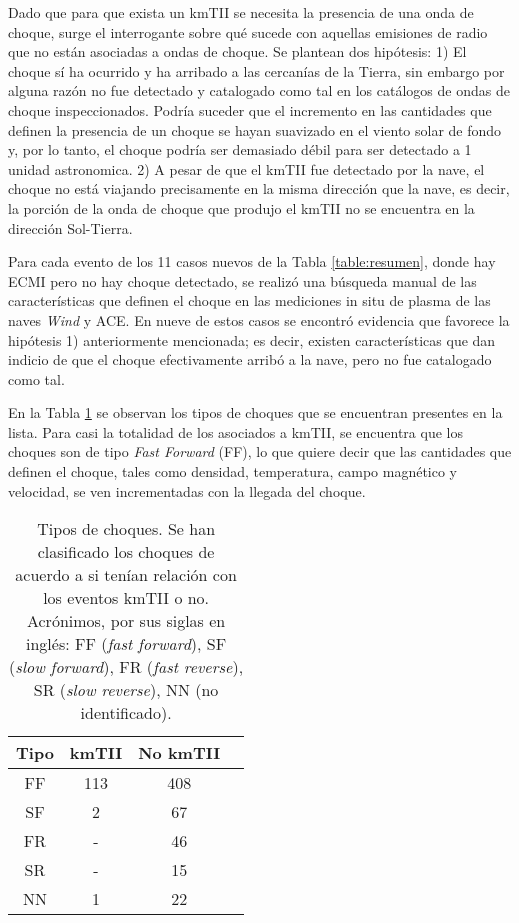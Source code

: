 \documentclass[baaa]{baaa}
\begin{document}
Dado que para que exista un kmTII se necesita la presencia de una onda de choque, surge el interrogante sobre qué sucede con aquellas emisiones de radio que no están asociadas a ondas de choque. Se plantean dos hipótesis: 1) El choque sí ha ocurrido y ha arribado a las cercanías de la Tierra, sin embargo por alguna razón no fue detectado y catalogado como tal en los catálogos de ondas de choque inspeccionados. Podría suceder que el incremento en las cantidades que definen la presencia de un choque se hayan suavizado en el viento solar de fondo y, por lo tanto, el choque podría ser demasiado débil para ser detectado a 1 unidad astronomica. 2) A pesar de que el kmTII fue detectado por la nave, el choque no está viajando precisamente en la misma dirección que la nave, es decir, la porción de la onda de choque que produjo el kmTII no se encuentra en la dirección Sol-Tierra. 

Para cada evento de los 11 casos nuevos de la Tabla \ref{table:resumen}, donde hay ECMI pero no hay choque detectado, se realizó una búsqueda manual de las características que definen el choque en las mediciones in situ de plasma de las naves \textit{Wind} y ACE. En nueve de estos casos se encontró evidencia que favorece la hipótesis 1) anteriormente mencionada; es decir, existen características que dan indicio de que el choque efectivamente arribó a la nave, pero no fue catalogado como tal.

En la Tabla \ref{table:shocks} se observan los tipos de choques que se encuentran presentes en la lista. Para casi la totalidad de los asociados a kmTII, se encuentra que los choques son de tipo \textit{Fast Forward} (FF), lo que quiere decir que las cantidades que definen el choque, tales como densidad, temperatura, campo magnético y velocidad, se ven incrementadas con la llegada del choque.

 \begin{table}[htbp]
 \begin{center}
 \caption{Tipos de choques. Se han clasificado los choques de acuerdo a si tenían relación con los eventos kmTII o no. Acrónimos, por sus siglas en inglés: FF (\textit{fast forward}), SF (\textit{slow forward}), FR (\textit{fast reverse}), SR (\textit{slow reverse}), NN (no identificado). }
\captionsetup{width=1\textwidth}
\begin{tabular}{cccc}
\hline
 Tipo & kmTII & No kmTII  \\
\hline
 FF &  113 & 408 \\
 SF & 2 & 67 \\
 FR & - & 46 \\
 SR & - & 15 \\
 NN & 1 & 22 \\
 \hline
\end{tabular}
\label{table:shocks}
\end{center}
\end{table}
\end{document}
